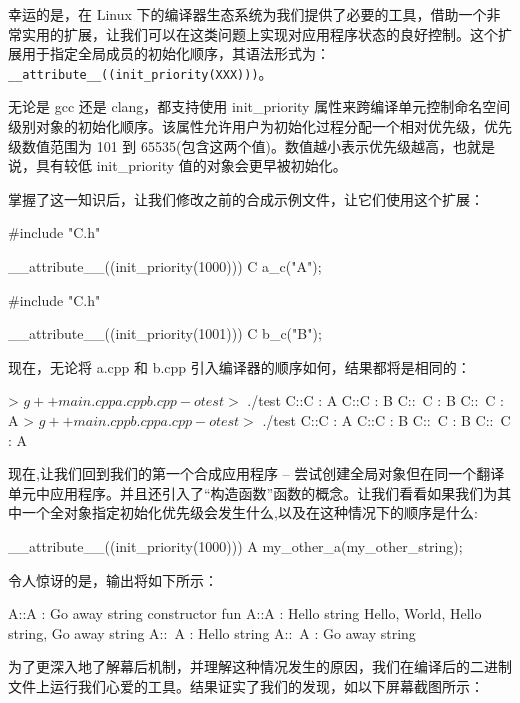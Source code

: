 幸运的是，在 Linux 下的编译器生态系统为我们提供了必要的工具，借助一个非常实用的扩展，让我们可以在这类问题上实现对应用程序状态的良好控制。这个扩展用于指定全局成员的初始化顺序，其语法形式为：\verb|__attribute__((init_priority(XXX)))|。

无论是 gcc 还是 clang，都支持使用 init\_priority 属性来跨编译单元控制命名空间级别对象的初始化顺序。该属性允许用户为初始化过程分配一个相对优先级，优先级数值范围为 101 到 65535(包含这两个值)。数值越小表示优先级越高，也就是说，具有较低 init\_priority 值的对象会更早被初始化。

掌握了这一知识后，让我们修改之前的合成示例文件，让它们使用这个扩展：


\begin{cpp}
#include "C.h"

__attribute__((init_priority(1000))) C a_c("A");
\end{cpp}


\begin{cpp}
#include "C.h"

__attribute__((init_priority(1001))) C b_c("B");
\end{cpp}

现在，无论将 a.cpp 和 b.cpp 引入编译器的顺序如何，结果都将是相同的：

\begin{shell}
> $ g++ main.cpp a.cpp b.cpp -o test
> $ ./test
C::C : A
C::C : B
C::~C : B
C::~C : A
> $ g++ main.cpp b.cpp a.cpp -o test
> $ ./test
C::C : A
C::C : B
C::~C : B
C::~C : A
\end{shell}

现在,让我们回到我们的第一个合成应用程序 – 尝试创建全局对象但在同一个翻译单元中应用程序。并且还引入了“构造函数”函数的概念。让我们看看如果我们为其中一个全对象指定初始化优先级会发生什么,以及在这种情况下的顺序是什么:

\begin{cpp}
__attribute__((init_priority(1000)))
A my_other_a(my_other_string);
\end{cpp}

令人惊讶的是，输出将如下所示：

\begin{shell}
A::A : Go away string
constructor fun
A::A : Hello string
Hello, World, Hello string, Go away string
A::~A : Hello string
A::~A : Go away string
\end{shell}

为了更深入地了解幕后机制，并理解这种情况发生的原因，我们在编译后的二进制文件上运行我们心爱的工具。结果证实了我们的发现，如以下屏幕截图所示：

